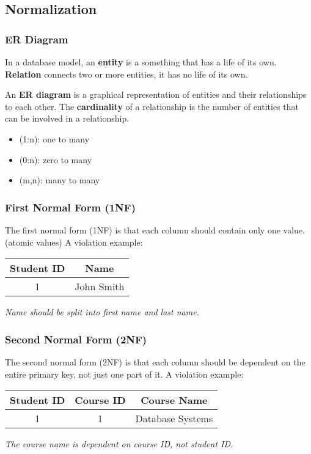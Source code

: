 \documentclass[a4paper,12pt]{article}
\begin{document}
\subsection{Normalization}

\subsubsection{ER Diagram}

In a database model, an \textbf{entity} is a something that has a life of its own.
\textbf{Relation} connects two or more entities, it has no life of its own.

An \textbf{ER diagram} is a graphical representation of entities and their relationships to each other.
The \textbf{cardinality} of a relationship is the number of entities that can be involved in a relationship.
\begin{itemize}
	\item (1:n): one to many
	\item (0:n): zero to many
	\item (m,n): many to many
\end{itemize}

\subsubsection{First Normal Form (1NF)}

The first normal form (1NF) is that each column should contain only one value. (atomic values)
A violation example:
\begin{center}
	\begin{tabular}{|c|c|}
		\hline
		\textbf{Student ID} & \textbf{Name} \\
		\hline
		1 & John Smith \\
		\hline
	\end{tabular}
\end{center}
\textit{Name should be split into first name and last name.}

\subsubsection{Second Normal Form (2NF)}

The second normal form (2NF) is that each column should be dependent on the entire primary key, not just one part of it.
A violation example:
\begin{center}
	\begin{tabular}{|c|c|c|}
		\hline
		\textbf{Student ID} & \textbf{Course ID} & \textbf{Course Name} \\
		\hline
		1 & 1 & Database Systems \\
		\hline
	\end{tabular}
\end{center}
\textit{The course name is dependent on course ID, not student ID.}
\end{document}
